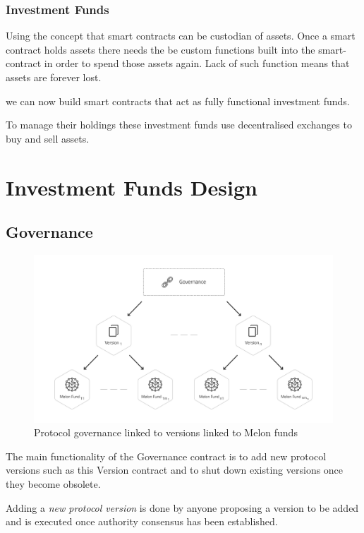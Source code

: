 \documentclass[conference]{IEEEtran}
\begin{document}
\subsubsection{Investment Funds}

Using the concept that smart contracts can be custodian of assets. Once a smart contract holds assets there needs the be custom functions built into the smart-contract in order to spend those assets again. Lack of such function means that assets are forever lost.

we can now build smart contracts that act as fully functional investment funds.

To manage their holdings these investment funds use decentralised exchanges to buy and sell assets.


\section{Investment Funds Design}

\subsection{Governance}

\begin{figure}[ht!]
	\centering
	\includegraphics[width=135mm]{images/governance.png}
	\caption{Protocol governance linked to versions linked to Melon funds\label{fig:governance}}
\end{figure}

The main functionality of the Governance contract is to add new protocol versions such as this Version contract and to shut down existing versions once they become obsolete.

Adding a \textit{new protocol version} is done by anyone proposing a version to be added and is executed once authority consensus has been established.
\end{document}
